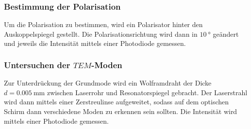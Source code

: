 \subsubsection{Bestimmung der Polarisation}

Um die Polarisation zu bestimmen, wird ein Polarisator hinter den Auskoppelspiegel gestellt. Die Polarisationsrichtung wird dann 
in $\SI{10}{\degree}$ geändert und jeweils die Intensität mittels einer Photodiode gemessen. 

\subsubsection{Untersuchen der $TEM$-Moden}

Zur Unterdrückung der Grundmode wird ein Wolframdraht der Dicke $d = \SI{0.005}{\milli\metre}$ zwischen Laserrohr und Resonatorspiegel
gebracht. Der Laserstrahl wird dann mittels einer Zerstreulinse aufgeweitet, sodass auf dem optischen Schirm dann verschiedene Moden
zu erkennen sein sollten. Die Intensität wird mittels einer Photodiode gemessen. 
